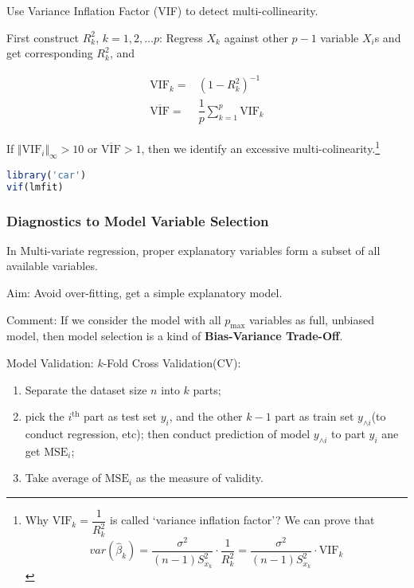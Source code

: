 \begin{point}
    Use Variance Inflation Factor (VIF) to detect multi-collinearity.
\end{point}    

    First construct $ R^2_k $, $ k=1,2,\ldots p $: Regress $ X_k $ against other $ p-1 $ variable $ X_i $s and get corresponding $ R^2_k $, and 

    \begin{align}
        \mathrm{VIF}_k=&(1-R^2_k)^{-1}\\
        \overline{\mathrm{VIF}} =&\dfrac{1}{p}\sum_{k=1}^p\mathrm{VIF}_k 
    \end{align}

    
    If $ \Vert \mathrm{VIF}_i\Vert _{\infty}>10 $ or $ \overline{\mathrm{VIF}}> 1 $, then we identify an excessive multi-colinearity.\footnote{Why $ \mathrm{VIF}_k=\dfrac{1}{R_k^2}  $ is called `variance inflation factor'? We can prove that 
\begin{equation}
    var(\hat{\beta }_k)=\dfrac{\sigma ^2}{(n-1)S_{x_k}^2}\cdot \dfrac{1}{R_k^2}= \dfrac{\sigma ^2}{(n-1)S_{x_k}^2}\cdot \mathrm{VIF}_k
\end{equation}

}

\begin{rcode}
\begin{lstlisting}[language=R]
library('car')
vif(lmfit)
\end{lstlisting}
\end{rcode}
    
    

    
\subsubsection{Diagnostics to Model Variable Selection}

        In Multi-variate regression, proper explanatory variables form a subset of all available variables.

        Aim: Avoid over-fitting, get a simple explanatory model.

        Comment: If we consider the model with all $ p_\mathrm{max} $ variables as full, unbiased model, then model selection is a kind of \textbf{Bias-Variance Trade-Off}. 

\begin{point}
    Model Validation: $ k $-Fold Cross Validation(CV): 
    \begin{enumerate}[topsep=2pt,itemsep=2pt]
        \item Separate the dataset size $ n $ into $ k $ parts;
        \item pick the $ i^\mathrm{th} $ part as test set $ y_i $, and the other $ k-1 $ part as train set $ y_{\wedge i} $(to conduct regression, etc); then conduct prediction of model $ y_{\wedge i} $ to part $ y_i $ ane get $ \mathrm{MSE}_i $;
        \item Take average of $ \mathrm{MSE}_i $ as the measure of validity.
    \end{enumerate}
\end{point}




